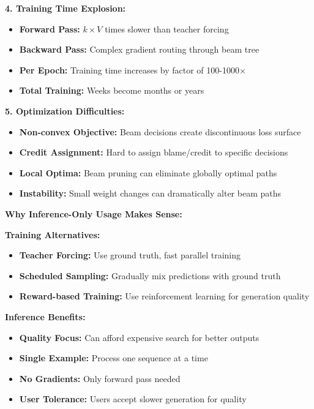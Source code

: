 \documentclass[12pt]{article}
\begin{document}
\begin{enumerate}[(a)]
{    \textbf{4. Training Time Explosion:}
    \begin{itemize}
        \item \textbf{Forward Pass:} $k \times V$ times slower than teacher forcing
        \item \textbf{Backward Pass:} Complex gradient routing through beam tree
        \item \textbf{Per Epoch:} Training time increases by factor of 100-1000×
        \item \textbf{Total Training:} Weeks become months or years
    \end{itemize}
    
    \textbf{5. Optimization Difficulties:}
    \begin{itemize}
        \item \textbf{Non-convex Objective:} Beam decisions create discontinuous loss surface
        \item \textbf{Credit Assignment:} Hard to assign blame/credit to specific decisions
        \item \textbf{Local Optima:} Beam pruning can eliminate globally optimal paths
        \item \textbf{Instability:} Small weight changes can dramatically alter beam paths
    \end{itemize}
    
    \textbf{Why Inference-Only Usage Makes Sense:}
    
    \textbf{Training Alternatives:}
    \begin{itemize}
        \item \textbf{Teacher Forcing:} Use ground truth, fast parallel training
        \item \textbf{Scheduled Sampling:} Gradually mix predictions with ground truth
        \item \textbf{Reward-based Training:} Use reinforcement learning for generation quality
    \end{itemize}
    
    \textbf{Inference Benefits:}
    \begin{itemize}
        \item \textbf{Quality Focus:} Can afford expensive search for better outputs
        \item \textbf{Single Example:} Process one sequence at a time
        \item \textbf{No Gradients:} Only forward pass needed
        \item \textbf{User Tolerance:} Users accept slower generation for quality
    \end{itemize}
    
}
\end{enumerate}
\end{document}
